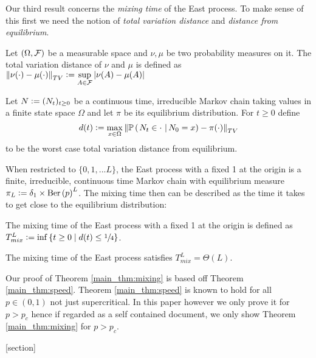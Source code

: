 Our third result concerns the \textit{mixing time} of the East process. To make sense of this first we need the notion of \textit{total variation distance} and \textit{distance from equilibrium}. 
\begin{definition}
Let $(\Omega, \cal{F})$ be a measurable space and $\nu, \mu$ be two probability measures on it. The total variation distance of $\nu$ and $\mu$ is defined as $\left\Vert \nu(\cdot) - \mu(\cdot) \right\Vert_{TV} \defeq \sup\limits_{A \in \cal{F}} \left| \nu(A) - \mu(A) \right|$
\end{definition}
\begin{definition}\label{def:eq_distance}
Let $N \defeq (N_t)_{t \geq 0}$ be a continuous time, irreducible Markov chain taking values in a finite state space $\Omega$ and let $\pi$ be its equilibrium distribution. For $t \geq 0$ define 
\begin{equation}\nonumber
d(t) \defeq \max\limits_{x \in \Omega} \left\Vert \PrCond{N_t \in \cdot\ }{N_0 = x} - \pi(\cdot) \right\Vert_{TV} 
\end{equation}
to be the worst case total variation distance from equilibrium. 
\end{definition}

When restricted to $\{0, 1, ... L\}$, the East process with a fixed 1 at the origin is a finite, irreducible, continuous time Markov chain with equilibrium measure $\pi_L \defeq \delta_{1} \times \dBer{p}^L$. The mixing time then can be described as the time it takes to get close to the equilibrium distribution:
\begin{definition}
The mixing time of the East process with a fixed 1 at the origin is defined as $T^L_{mix} \defeq \inf\left\{ t \geq 0 \mid d(t) \leq \sfrac{1}{4} \right\}$. 
\end{definition}

\begin{theorem}\label{main_thm:mixing}
The mixing time of the East process satisfies $T^L_{mix} = \Theta(L)$. 
\end{theorem}

\begin{remark}
Our proof of Theorem \ref{main_thm:mixing} is based off Theorem \ref{main_thm:speed}. Theorem \ref{main_thm:speed} is known to hold for all $p \in (0,1)$ not just supercritical. In this paper however we only prove it for $p > p_c$ hence if regarded as a self contained document, we only show Theorem \ref{main_thm:mixing} for $p > p_c$. 
\end{remark}

[section]
